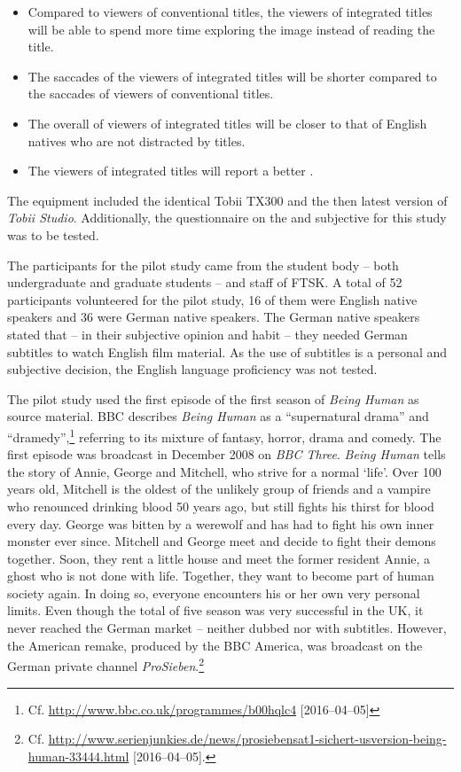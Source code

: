 \begin{itemize}
\item Compared to viewers of conventional titles, the viewers of integrated titles will be able to spend more time exploring the image instead of reading the title.
\item The saccades of the viewers of integrated titles will be shorter compared to the saccades of viewers of conventional titles.
\item The overall  of viewers of integrated titles will be closer to that of English natives who are not distracted by titles.
\item The viewers of integrated titles will report a better .
\end{itemize}

The equipment included the identical  Tobii TX300 and the then latest version of \textit{Tobii Studio}. Additionally, the questionnaire on the  and subjective  for this study was to be tested.

The participants for the pilot study came from the student body – both undergraduate and graduate students – and staff of FTSK. A total of 52 participants volunteered for the pilot study, 16 of them were English native speakers and 36 were German native speakers. The German native speakers stated that – in their subjective opinion and habit – they needed German subtitles to watch English film material. As the use of subtitles is a personal and subjective decision, the English language proficiency was not tested.

The pilot study used the first episode of the first season of \textit{Being Human} as source material. BBC describes \textit{Being Human} as a “supernatural drama” and “dramedy”,\footnote{Cf. \url{http://www.bbc.co.uk/programmes/b00hqlc4} [2016--04--05]} referring to its mixture of fantasy, horror, drama and comedy. The first episode was broadcast in December 2008 on \textit{BBC Three}. \textit{Being Human} tells the story of Annie, George and Mitchell, who strive for a normal ‘life’. Over 100 years old, Mitchell is the oldest of the unlikely group of friends and a vampire who renounced drinking blood 50 years ago, but still fights his thirst for blood every day. George was bitten by a werewolf and has had to fight his own inner monster ever since. Mitchell and George meet and decide to fight their demons together. Soon, they rent a little house and meet the former resident Annie, a ghost who is not done with life. Together, they want to become part of human society again. In doing so, everyone encounters his or her own very personal limits. Even though the total of five season was very successful in the UK, it never reached the German market – neither dubbed nor with subtitles. However, the American remake, produced by the BBC America, was broadcast on the German private channel \textit{ProSieben}.\footnote{Cf. \url{http://www.serienjunkies.de/news/prosiebensat1-sichert-usversion-being-human-33444.html} [2016--04--05].}

